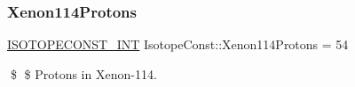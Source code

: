 \subsubsection{\texorpdfstring{Xenon114\+Protons}{Xenon114Protons}}
{\footnotesize\ttfamily \mbox{\hyperlink{group___isotope_const-_macros_ga5f18360b3e99483a35c32d789e62621c}{I\+S\+O\+T\+O\+P\+E\+C\+O\+N\+S\+T\+\_\+\+I\+NT}} Isotope\+Const\+::\+Xenon114\+Protons = 54}

\$ \$ Protons in Xenon-\/114. 
